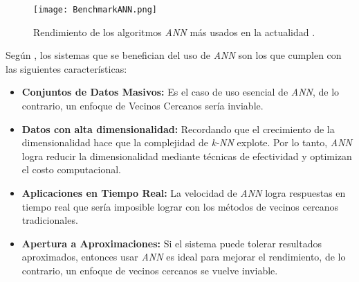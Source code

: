 \begin{figure}[h!]
    \centering
    \texttt{[image: BenchmarkANN.png]}
    \caption{Rendimiento de los algoritmos \textit{ANN} más usados en la actualidad \parencite{20239d146dff4b27bd57f85484104308}.}
    \label{fig:BenchmarkANN} 
\end{figure}

\newpage

Según \parencite{team-2025}, los sistemas que se benefician del uso de \textit{ANN} son los que cumplen con las siguientes características:
\begin{itemize}
    \item \textbf{Conjuntos de Datos Masivos: } Es el caso de uso esencial de \textit{ANN}, de lo contrario, un enfoque de Vecinos Cercanos sería inviable.
    \item \textbf{Datos con alta dimensionalidad: } Recordando que el crecimiento de la dimensionalidad hace que la complejidad de \textit{k-NN} explote. Por lo tanto, \textit{ANN} logra reducir la dimensionalidad mediante técnicas de efectividad y optimizan el costo computacional.
    \item \textbf{Aplicaciones en Tiempo Real: } La velocidad de \textit{ANN} logra respuestas en tiempo real que sería imposible lograr con los métodos de vecinos cercanos tradicionales.
    \item \textbf{Apertura a Aproximaciones: } Si el sistema puede tolerar resultados aproximados, entonces usar \textit{ANN} es ideal para mejorar el rendimiento, de lo contrario, un enfoque de vecinos cercanos se vuelve inviable.
\end{itemize}
